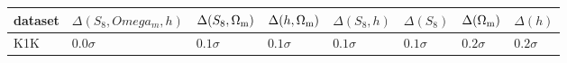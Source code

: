 \documentclass{standalone}
\begin{document}
\begin{tabular}{llllllll}
\toprule
dataset & $\Delta(S_8, Omega_m, h)$ & $\Delta(S_8,\Omega_{\rm m})$ & $\Delta(h,\Omega_{\rm m})$ & $\Delta(S_8,h)$ & $\Delta(S_8)$ & $\Delta(\Omega_{\rm m})$ &    $\Delta(h)$ \\
\midrule
    K1K &              $0.0 \sigma$ &                 $0.1 \sigma$ &               $0.1 \sigma$ &    $0.1 \sigma$ &  $0.1 \sigma$ &             $0.2 \sigma$ &  $0.2 \sigma$ \\
\bottomrule
\end{tabular}
\end{document}
